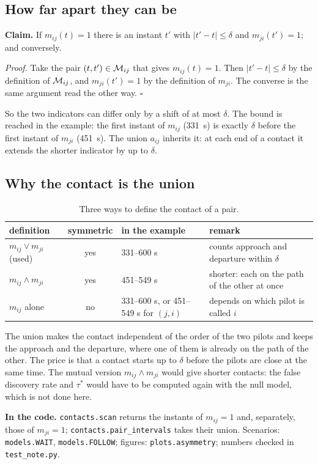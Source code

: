 \subsection{How far apart they can be}

\textbf{Claim.} If $m_{ij}(t)=1$ there is an instant $t'$ with $|t'-t|\le\delta$ and $m_{ji}(t')=1$;
and conversely.

\emph{Proof.} Take the pair $(t,t')\in\mathcal{M}_{ij}$ that gives $m_{ij}(t)=1$. Then $|t'-t|\le\delta$ by
the definition of $\mathcal{M}_{ij}$, and $m_{ji}(t')=1$ by the definition of $m_{ji}$. The converse is the
same argument read the other way. \hfill$\square$

So the two indicators can differ only by a shift of at most $\delta$. The bound is reached in the
example: the first instant of $m_{ij}$ (331~s) is exactly $\delta$ before the first instant of
$m_{ji}$ (451~s). The union $a_{ij}$ inherits it: at each end of a contact it extends the shorter
indicator by up to $\delta$.

\subsection{Why the contact is the union}

\begin{table}[htbp]
\centering\footnotesize
\begin{tabular}{@{}l c l l@{}}
\toprule
definition & symmetric & in the example & remark \\
\midrule
$m_{ij}\vee m_{ji}$ (used) & yes & 331--600 s & counts approach and departure within $\delta$ \\
$m_{ij}\wedge m_{ji}$ & yes & 451--549 s & shorter: each on the path of the other at once \\
$m_{ij}$ alone & no & 331--600 s, or 451--549 s for $(j,i)$ & depends on which pilot is called $i$ \\
\bottomrule
\end{tabular}
\caption{Three ways to define the contact of a pair.}
\label{tab:asym-union}
\end{table}

The union makes the contact independent of the order of the two pilots and keeps the approach and
the departure, where one of them is already on the path of the other. The price is that a contact
starts up to $\delta$ before the pilots are close at the same time. The mutual version
$m_{ij}\wedge m_{ji}$ would give shorter contacts: the false discovery rate and $\tau^*$ would have
to be computed again with the null model, which is not done here.

\textbf{In the code.} \texttt{contacts.scan} returns the instants of $m_{ij}=1$ and, separately,
those of $m_{ji}=1$; \texttt{contacts.pair\_\allowbreak intervals} takes their union. Scenarios:
\texttt{models.WAIT}, \texttt{models.FOLLOW}; figures: \texttt{plots.asymmetry}; numbers checked
in \texttt{test\_note.py}.
